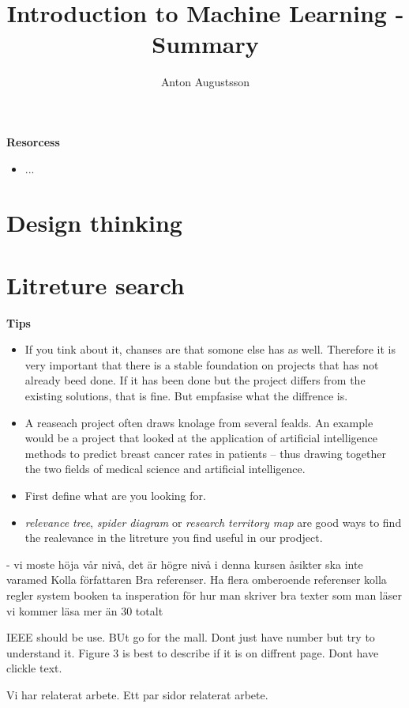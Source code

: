 \documentclass{article}
\title{Introduction to Machine Learning - Summary}
\author{Anton Augustsson}
\begin{document}
\maketitle
\newpage
\tableofcontents
\newpage

\textbf{Resorcess}
\begin{itemize}
    \item ... 
\end{itemize}


\section{Design thinking}

\section{Litreture search}
\textbf{Tips}
\begin{itemize}
\item If you tink about it, chanses are that somone else has as well. Therefore it is very important
  that there is a stable foundation on projects that has not already beed done. If it has been done
  but the project differs from the existing solutions, that is fine. But empfasise what the diffrence is.
\item A reaseach project often draws knolage from several fealds. An example would be a project
that looked at the application of artificial intelligence methods to predict breast cancer
rates in patients – thus drawing together the two fields of medical science and artificial
intelligence. 
\item First define what are you looking for.
\item \textit{relevance tree}, \textit{spider diagram} or \textit{research territory map} are good ways to find the realevance in the litreture you find useful in our prodject. 
\end{itemize}


- vi moste höja vår nivå, det är högre nivå i denna kursen
åsikter ska inte varamed
Kolla författaren
Bra referenser.
Ha flera omberoende referenser
kolla regler system booken
ta insperation för hur man skriver bra texter som man läser
vi kommer läsa mer än 30 totalt

IEEE should be use. BUt go for the mall. Dont just have number but try to understand it. Figure 3 is best to describe if it is on diffrent page. Dont have clickle text.

Vi har relaterat arbete. Ett par sidor relaterat arbete.
\end{document}
